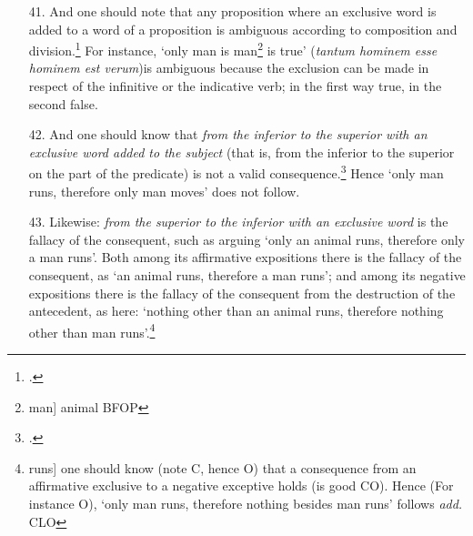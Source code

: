 \begin{itemize}
\item[41.] And one should note that any proposition where an exclusive word is added to a word of a proposition is ambiguous according to composition and division.\footnote{\cite[p. 140.7]{BurleyDPAL}.} For instance, `only man is man\footnote{man] animal BFOP} is true' (\textit{tantum hominem esse hominem est verum})is ambiguous because the exclusion can be made in respect of the infinitive or the indicative verb; in the first way true, in the second false.
\item[42.] And one should know that \textit{from the inferior to the superior with an exclusive word added to the subject} (that is, from the inferior to the superior on the part of the predicate) is not a valid consequence.\footnote{\cite[p. 134.13]{BurleyDPAL}.} Hence `only man runs, therefore only man moves' does not follow.
\item[43.] Likewise: \textit{from the superior to the inferior with an exclusive word} is the fallacy of the consequent, such as arguing `only an animal runs, therefore only a man runs'. Both among its affirmative expositions there is the fallacy of the consequent, as `an animal runs, therefore a man runs'; and among its negative expositions there is the fallacy of the consequent from the destruction of the antecedent, as here: `nothing other than an animal runs, therefore nothing other than man runs'.\footnote{runs] one should know (note C, hence O) that a consequence from an affirmative exclusive to a negative exceptive holds (is good CO). Hence (For instance O), `only man runs, therefore nothing besides man runs' follows \textit{add.} CLO}
\end{itemize}
